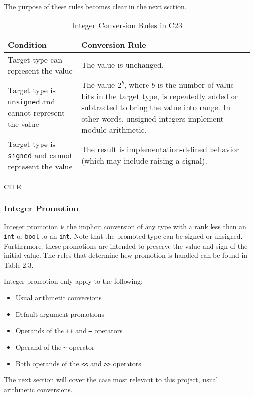 The purpose of these rules becomes clear in the next section.

\newpage
\begin{table}[h!]
\centering
\begin{tabular}{|p{4cm}|p{10cm}|}
\hline
\textbf{Condition} & \textbf{Conversion Rule} \\
\hline
Target type can represent the value & The value is unchanged. \\
\hline
Target type is \texttt{unsigned} and cannot represent the value & The value $2^b$, where $b$ is the number of value bits in the target type, is repeatedly added or subtracted to bring the value into range. In other words, unsigned integers implement modulo arithmetic. \\
\hline
Target type is \texttt{signed} and cannot represent the value & The result is implementation-defined behavior (which may include raising a signal). \\
\hline
\end{tabular}
\caption{Integer Conversion Rules in C23}
\end{table}
CITE
\newpage

\subsubsection{Integer Promotion}

Integer promotion is the implicit conversion of any type with a rank less than an \texttt{int} or \texttt{bool} to an \texttt{int}. Note that the promoted type can be signed or unsigned. Furthermore, these promotions are intended to preserve the value and sign of the initial value. The rules that determine how promotion is handled can be found in Table 2.3.

Integer promotion only apply to the following:
\begin{itemize}
    \item Usual arithmetic conversions
    \item Default argument promotions
    \item Operands of the \texttt{++} and \texttt{--} operators
    \item Operand of the \texttt{\textasciitilde} operator
    \item Both operands of the \texttt{<<} and \texttt{>>} operators
\end{itemize}

The next section will cover the case most relevant to this project, usual arithmetic conversions.

